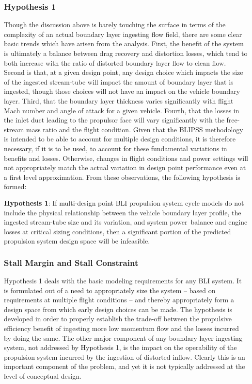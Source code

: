 			\subsubsection{Hypothesis 1}
				Though the discussion above is barely touching the surface in terms of the complexity of an actual boundary layer ingesting flow field, there are some clear basic trends which have arisen from the analysis.  First, the benefit of the system is ultimately a balance between drag recovery and distortion losses, which tend to both increase with the ratio of distorted boundary layer flow to clean flow.  Second is that, at a given design point, any design choice which impacts the size of the ingested stream-tube will impact the amount of boundary layer that is ingested, though those choices will not have an impact on the vehicle boundary layer.  Third, that the boundary layer thickness varies significantly with flight Mach number and angle of attack for a given vehicle.  Fourth, that the losses in the inlet duct leading to the propulsor face will vary significantly with the free-stream mass ratio and the flight condition.  Given that the BLIPSS methodology is intended to be able to account for multiple design conditions, it is therefore necessary, if it is to be used, to account for these fundamental variations in benefits and losses.  Otherwise, changes in flight conditions and power settings will not appropriately match the actual variation in design point performance even at a first level approximation.  From these observations, the following hypothesis is formed:
				
				
				\noindent\makebox[\linewidth]{\rule{\textwidth}{3pt}}				
					 \textbf{Hypothesis 1}:  If multi-design point BLI propulsion system cycle models do not include the physical relationship between the vehicle boundary layer profile, the ingested stream-tube size and its variation, and system power balance and engine losses at critical sizing conditions, then a significant portion of the predicted propulsion system design space will be infeasible.\\
				\noindent\makebox[\linewidth]{\rule{\textwidth}{3pt}}	

	
			\subsubsection{Stall Margin and Stall Constraint}
				\indent Hypothesis 1 deals with the basic modeling requirements for any BLI system.  It is formulated out of a need to appropriately size the system -- based on requirements at multiple flight conditions -- and thereby appropriately form a design space from which early design choices can be made.  The hypothesis is developed in order to properly establish the trade-off between the propulsive efficiency benefit of ingesting more low momentum flow and the losses incurred by doing the same.  The other major component of any boundary layer ingesting system, not addressed by Hypothesis 1, is the impact on the operability of the propulsion system incurred by the ingestion of distorted inflow.  Clearly this is an important component of the problem, and yet it is not typically addressed at the level of conceptual design.  			
				
